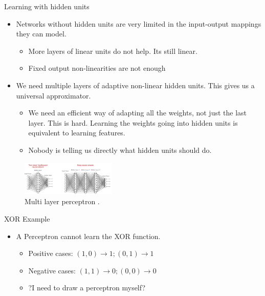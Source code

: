 \begin{frame}{Learning with hidden units}
    \begin{itemize}
        \item Networks without hidden units are very limited in the
input-output mappings they can model.
        \begin{itemize}
            \item More layers of linear units do not help. Its still linear.
            \item Fixed output non-linearities are not enough
        \end{itemize}
        \item We need multiple layers of adaptive non-linear hidden
units. This gives us a universal approximator.
        \begin{itemize}
            \item We need an efficient way of adapting all the weights,
not just the last layer. This is hard. Learning the
weights going into hidden units is equivalent to
learning features.
            \item Nobody is telling us directly what hidden units should
do.
        \end{itemize}
    \end{itemize}
    \begin{figure}[H]
		\centering
		\includegraphics[width=0.4\textwidth]{Figs/MLP1.png}
		\caption{Multi layer perceptron \cite{https://www.projectpro.io/article/deep-learning-algorithms/443}.}
	\end{figure}
\end{frame}

\begin{frame}{XOR Example}
    \begin{itemize}
        \item A Perceptron cannot learn the XOR function. 
        \begin{itemize}
            \item Positive cases: $(1, 0) \to 1; (0, 1) \to 1$
            \item Negative cases: $(1, 1) \to 0; (0, 0) \to 0$
            \item ?I need to draw a perceptron myself?
        \end{itemize}
    \end{itemize}
\end{frame}


